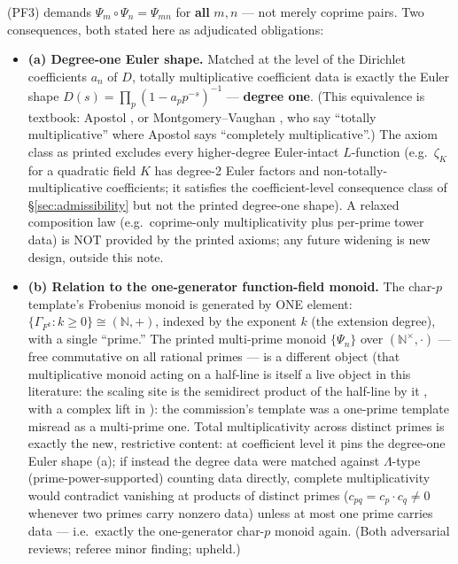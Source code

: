 \documentclass[11pt]{article}
\theoremstyle{plain}
\theoremstyle{definition}
\theoremstyle{remark}
\begin{document}
(PF3) demands $\Psi_m \circ \Psi_n = \Psi_{mn}$ for \textbf{all} $m, n$ --- not
merely coprime pairs. Two consequences, both stated here as adjudicated
obligations:

\begin{itemize}
\item \textbf{(a) Degree-one Euler shape.} Matched at the level of the
Dirichlet coefficients $a_n$ of $D$, totally multiplicative coefficient data is
exactly the Euler shape
$D(s) = \prod_p (1 - a_p p^{-s})^{-1}$ --- \textbf{degree one}. (This
equivalence is textbook: Apostol \cite[Ch.~11]{Apostol}, or Montgomery--Vaughan
\cite[\S1.3, Thm.~1.9]{MV}, who say ``totally multiplicative'' where Apostol says
``completely multiplicative''.) The axiom
class as printed excludes every higher-degree Euler-intact $L$-function (e.g.\
$\zeta_K$ for a quadratic field $K$ has degree-2 Euler factors and
non-totally-multiplicative coefficients; it satisfies the coefficient-level
consequence class of \S\ref{sec:admissibility} but not the printed degree-one
shape). A relaxed composition law (e.g.\ coprime-only multiplicativity plus
per-prime tower data) is NOT provided by the printed axioms; any future
widening is new design, outside this note.
\item \textbf{(b) Relation to the one-generator function-field monoid.} The
char-$p$ template's Frobenius monoid is generated by ONE element:
$\{\Gamma_{F^k} : k \ge 0\} \cong (\mathbb{N}, +)$, indexed by the exponent
$k$ (the extension degree), with a single ``prime.'' The printed multi-prime
monoid $\{\Psi_n\}$ over $(\mathbb{N}^\times, \cdot)$ --- free commutative on
all rational primes --- is a different object (that multiplicative monoid acting on
a half-line is itself a live object in this literature: the scaling site is the
semidirect product of the half-line by it \cite{CC16b, CC17}, with a complex lift
in \cite{CC19}): the commission's template was a
one-prime template misread as a multi-prime one. Total multiplicativity across
distinct primes is exactly the new, restrictive content: at coefficient level
it pins the degree-one Euler shape (a); if instead the degree data were matched
against $\Lambda$-type (prime-power-supported) counting data directly, complete
multiplicativity would contradict vanishing at products of distinct primes
($c_{pq} = c_p \cdot c_q \ne 0$ whenever two primes carry nonzero data) unless
at most one prime carries data --- i.e.\ exactly the one-generator char-$p$
monoid again. (Both adversarial reviews; referee minor finding; upheld.)
\end{itemize}
\end{document}
